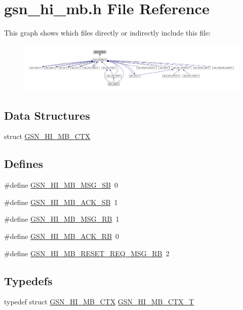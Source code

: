 \hypertarget{a00506}{
\section{gsn\_\-hi\_\-mb.h File Reference}
\label{a00506}
}
This graph shows which files directly or indirectly include this file:
\nopagebreak
\begin{figure}[H]
\begin{center}
\leavevmode
\includegraphics[width=400pt]{a00737}
\end{center}
\end{figure}
\subsection*{Data Structures}
\begin{DoxyCompactItemize}
\item 
struct \hyperlink{a00089}{GSN\_\-HI\_\-MB\_\-CTX}
\end{DoxyCompactItemize}
\subsection*{Defines}
\begin{DoxyCompactItemize}
\item 
\#define \hyperlink{a00506_a24c17224665b2175de44eef6666d844a}{GSN\_\-HI\_\-MB\_\-MSG\_\-SB}~0
\item 
\#define \hyperlink{a00506_a8d3b3866f9d09968c947cef8e2e7c61b}{GSN\_\-HI\_\-MB\_\-ACK\_\-SB}~1
\item 
\#define \hyperlink{a00506_ac9fe421d7ea35b912a309a151189e8f4}{GSN\_\-HI\_\-MB\_\-MSG\_\-RB}~1
\item 
\#define \hyperlink{a00506_a309981ae0389b7dfeac5a7cf8fdb4575}{GSN\_\-HI\_\-MB\_\-ACK\_\-RB}~0
\item 
\#define \hyperlink{a00506_a82316e9aa8750e0f14322eac4e824279}{GSN\_\-HI\_\-MB\_\-RESET\_\-REQ\_\-MSG\_\-RB}~2
\end{DoxyCompactItemize}
\subsection*{Typedefs}
\begin{DoxyCompactItemize}
\item 
typedef struct \hyperlink{a00089}{GSN\_\-HI\_\-MB\_\-CTX} \hyperlink{a00506_a99ba5f3828c434894ed3e105eaff5a11}{GSN\_\-HI\_\-MB\_\-CTX\_\-T}
\end{DoxyCompactItemize}
